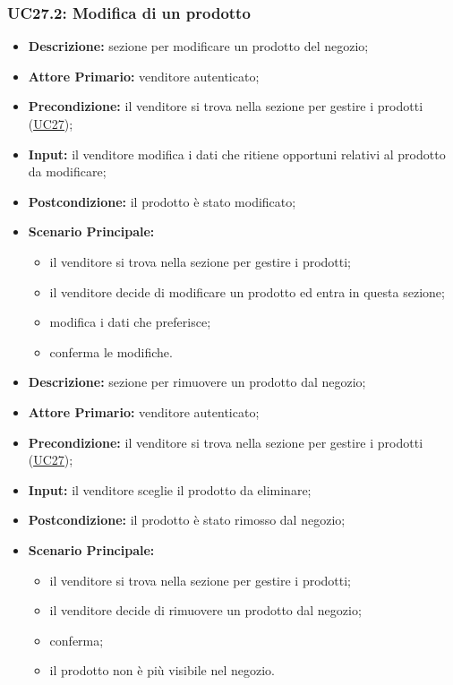         \subsubsection{UC27.2: Modifica di un prodotto}
        \begin{itemize}
            \item \textbf{Descrizione:} sezione per modificare un prodotto del negozio;
            \item \textbf{Attore Primario:} venditore autenticato;
            \item \textbf{Precondizione:} il venditore si trova nella sezione per gestire i prodotti (\hyperref[sec:UC27]{\underline{UC27}});
            \item \textbf{Input:} il venditore modifica i dati che ritiene opportuni relativi al prodotto da modificare;
            \item \textbf{Postcondizione:} il prodotto è stato modificato;
            \item \textbf{Scenario Principale:} 
                \begin{itemize}
                    \item il venditore si trova nella sezione per gestire i prodotti;
                    \item il venditore decide di modificare un prodotto ed entra in questa sezione;
                    \item modifica i dati che preferisce;
                    \item conferma le modifiche.
                \end{itemize}
        \end{itemize}
        \begin{itemize}
            \item \textbf{Descrizione:} sezione per rimuovere un prodotto dal negozio;
            \item \textbf{Attore Primario:} venditore autenticato;
            \item \textbf{Precondizione:} il venditore si trova nella sezione per gestire i prodotti (\hyperref[sec:UC27]{\underline{UC27}});
            \item \textbf{Input:} il venditore sceglie il prodotto da eliminare;
            \item \textbf{Postcondizione:} il prodotto è stato rimosso dal negozio;
            \item \textbf{Scenario Principale:} 
                \begin{itemize}
                    \item il venditore si trova nella sezione per gestire i prodotti;
                    \item il venditore decide di rimuovere un prodotto dal negozio;
                    \item conferma;
                    \item il prodotto non è più visibile nel negozio.
                \end{itemize}
        \end{itemize}